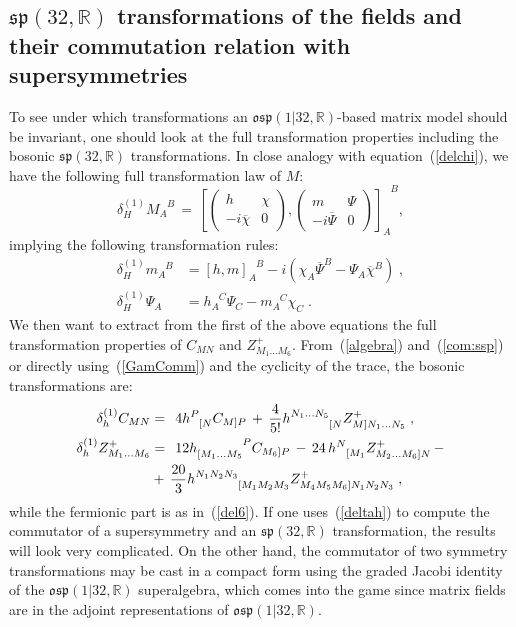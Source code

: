 \documentclass[a4paper,11pt]{article}
\begin{document}
\subsection{$\mathfrak{sp}(32,\mathbb{R})$ transformations of the
fields and their commutation relation with supersymmetries}
To see under which transformations an $\mathfrak{osp}(1|32,\mathbb{R})$-based matrix model should be invariant,
one should look at the full transformation properties including the bosonic $\mathfrak{sp}(32,\mathbb{R})$ 
transformations. In close analogy with equation~(\ref{delchi}), we have the following full transformation law of $M$:
\begin{equation}\label{del}
\delta_H^{(1)}M_A^{\phantom{A}B}\, =\, \left[
\begin{pmatrix}
h & \chi \\
-i \overline{\chi} & 0 
\end{pmatrix}
,
\begin{pmatrix}
m & \Psi \\
-i \overline{\Psi} & 0 
\end{pmatrix}
\right]_A^{\phantom{A}B}, 
\end{equation}
implying the following transformation rules:
\begin{align}
\delta_{H}^{(1)} m_A^{\phantom{A}B} &= 
[h,m]_A^{\phantom{A}B} - i (\chi_A \overline{\Psi}^B - \Psi_A \overline{\chi}^B) \;,\\
\delta_{H}^{(1)} \Psi_A &= h_A^{\phantom{A}C} \Psi_C - m_A^{\phantom{A}C} \chi_C \;.
\end{align}
We then want to extract from the first of the above equations the full
transformation properties  of $C_{MN}$ and $Z^+_{M_1 \ldots M_6}$.
From~(\ref{algebra}) and~(\ref{com:ssp}) or directly using~(\ref{GamComm}) and the cyclicity of the trace, 
the bosonic transformations are: 
\begin{align}\label{deltah}
\delta_{h}^{(1)} C_{MN} &=\; 
\, 4 h^{P}_{\phantom{P}[N} C_{M]P} \,+\, 
\frac{4}{5!} h^{N_1 \ldots N_5}_{\phantom{N_1 \ldots N_5}[N} 
Z^+_{M]N_1 \ldots N_5} \;,\notag\\
\delta_{h}^{(1)} Z^+_{M_1 \ldots M_6} &=\;
\,12h_{[M_1 \ldots M_5}^{\phantom{[M_1 \ldots M_5}P} C_{M_6] P} 
\,-\,24 \, h^N_{\phantom{N}[M_1} Z^+_{M_2 \ldots M_6] N}\,-\\
&+\, \frac{20}{3} h^{N_1 N_2 N_3}_{\phantom{N_1 N_2 N_3}[M_1 M_2 M_3} 
Z^+_{M_4 M_5 M_6] N_1 N_2 N_3}\;,\notag
\end{align}
while the fermionic part is as in~(\ref{del6}). 
If one uses~(\ref{deltah}) to compute the commutator of a supersymmetry 
and an $\mathfrak{sp}(32,\mathbb{R})$ transformation, the results will look very complicated.
On the other hand, the commutator of two symmetry transformations may be cast in a compact
form using the graded Jacobi identity of the $\mathfrak{osp}(1|32,\mathbb{R})$ superalgebra, 
which comes into the game since matrix fields are in the adjoint representations of
$\mathfrak{osp}(1|32,\mathbb{R})$. 
\end{document}
